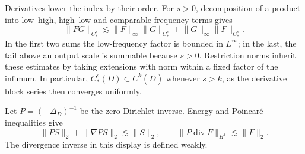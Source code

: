 \documentclass[11pt]{article}
\theoremstyle{remark}
\newcommand{\diver}{\operatorname{div}}
\newcommand{\norm}[1]{\lVert #1\rVert}
\begin{document}
Derivatives lower the index by their order. For $s>0$, decomposition of a product into low--high, high--low and comparable-frequency terms gives
\begin{equation}\label{eq:product}
 \norm{FG}_{C_*^s}\lesssim
 \norm{F}_\infty\norm{G}_{C_*^s}
 +\norm{G}_\infty\norm{F}_{C_*^s}.
\end{equation}
In the first two sums the low-frequency factor is bounded in $L^\infty$; in the last, the tail above an output scale is summable because $s>0$. Restriction norms inherit these estimates by taking extensions with norm within a fixed factor of the infimum. In particular, $C_*^s(D)\subset C^k(\overline D)$ whenever $s>k$, as the derivative block series then converges uniformly.

Let $P=(-\Delta_D)^{-1}$ be the zero-Dirichlet inverse. Energy and Poincar\'e inequalities give
\begin{equation}\label{eq:energy}
 \norm{PS}_2+\norm{\nabla PS}_2\lesssim\norm{S}_2,
 \qquad
 \norm{P\diver F}_{H^1}\lesssim\norm{F}_2.
\end{equation}
The divergence inverse in this display is defined weakly. 
\end{document}
